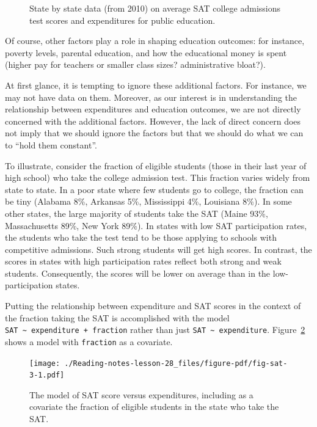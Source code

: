\documentclass[
  letterpaper,
  DIV=11,
  numbers=noendperiod,
  oneside]{scrreprt}
\begin{document}
\begin{tcolorbox}
\begin{figure}[H]
{}

\caption{\label{fig-sat-1}State by state data (from 2010) on average SAT
college admissions test scores and expenditures for public education.}

\end{figure}

Of course, other factors play a role in shaping education outcomes: for
instance, poverty levels, parental education, and how the educational
money is spent (higher pay for teachers or smaller class sizes?
administrative bloat?).

At first glance, it is tempting to ignore these additional factors. For
instance, we may not have data on them. Moreover, as our interest is in
understanding the relationship between expenditures and education
outcomes, we are not directly concerned with the additional factors.
However, the lack of direct concern does not imply that we should ignore
the factors but that we should do what we can to ``hold them constant''.

To illustrate, consider the fraction of eligible students (those in
their last year of high school) who take the college admission test.
This fraction varies widely from state to state. In a poor state where
few students go to college, the fraction can be tiny (Alabama 8\%,
Arkansas 5\%, Mississippi 4\%, Louisiana 8\%). In some other states, the
large majority of students take the SAT (Maine 93\%, Massachusetts 89\%,
New York 89\%). In states with low SAT participation rates, the students
who take the test tend to be those applying to schools with competitive
admissions. Such strong students will get high scores. In contrast, the
scores in states with high participation rates reflect both strong and
weak students. Consequently, the scores will be lower on average than in
the low-participation states.

Putting the relationship between expenditure and SAT scores in the
context of the fraction taking the SAT is accomplished with the model
\texttt{SAT\ \textasciitilde{}\ expenditure\ +\ fraction} rather than
just \texttt{SAT\ \textasciitilde{}\ expenditure}.
Figure~\ref{fig-sat-3} shows a model with \texttt{fraction} as a
covariate.

\begin{figure}[H]

{\centering \texttt{[image: ./Reading-notes-lesson-28\_files/figure-pdf/fig-sat-3-1.pdf]}

}

\caption{\label{fig-sat-3}The model of SAT score versus expenditures,
including as a covariate the fraction of eligible students in the state
who take the SAT.}


\end{figure}
\end{tcolorbox}
\end{document}
